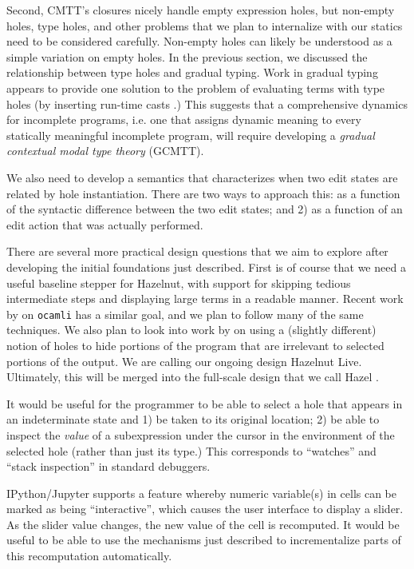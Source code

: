 Second, CMTT's closures nicely handle empty expression holes, but non-empty holes, type holes, and other problems that we plan to internalize with our statics need to be considered carefully. Non-empty holes can likely be understood as a simple variation on empty holes. In the previous section, we discussed the relationship between type holes and gradual typing. Work in gradual typing appears to provide one solution to the problem of evaluating terms with type holes (by inserting run-time casts \cite{Siek06a}.) This suggests that a comprehensive dynamics for incomplete programs, i.e. one that assigns dynamic meaning to every statically meaningful incomplete program, will require developing a \emph{gradual contextual modal type theory} (GCMTT).

We also need to develop a semantics that characterizes when two edit states are related by hole instantiation. There are two ways to approach this: as a function of the syntactic difference between the two edit states; and 2) as a function of an edit action that was actually performed.

There are several more practical design questions that we aim to explore after developing the initial foundations just described. First is of course that we need a useful baseline stepper for Hazelnut, with support for skipping tedious intermediate steps and displaying large terms in a readable manner. Recent work by \citet{ocaml-stepper} on \texttt{ocamli} has a similar goal, and we plan to follow many of the same techniques. We also plan to look into work by \citet{DBLP:conf/icfp/PereraACL12} on using a (slightly different) notion of holes to hide portions of the program that are irrelevant to selected portions of the output. We are calling our ongoing design Hazelnut Live. Ultimately, this will be merged into the full-scale design that we call Hazel \cite{snapl17-paper}.

It would be useful for the programmer to be able to select a hole that appears in an indeterminate state and 1) be taken to its original location; 2) be able to inspect the \emph{value} of a subexpression under the cursor in the environment of the selected hole (rather than just its type.) This corresponds to ``watches'' and ``stack inspection'' in standard debuggers.

IPython/Jupyter \cite{PER-GRA:2007} supports a feature whereby numeric variable(s) in cells can be marked as being ``interactive'', which causes the user interface to display a slider. As the slider value changes, the new value of the cell is recomputed. It would be useful to be able to use the mechanisms just described to incrementalize parts of this recomputation automatically.

